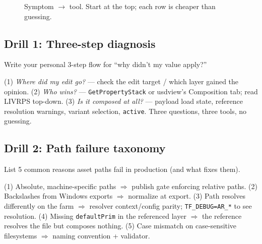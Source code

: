 \begin{figure}[ht]
  \centering
  \caption{Symptom $\rightarrow$ tool. Start at the top; each row is cheaper
  than guessing.}
  \label{fig:debug-tree}
\end{figure}

\DrillsTitle
\subsection*{Drill 1: Three-step diagnosis}
Write your personal 3-step flow for ``why didn't my value apply?''
\begin{DrillSolution}
(1) \emph{Where did my edit go?} --- check the edit target / which layer
gained the opinion. (2) \emph{Who wins?} --- \texttt{GetPropertyStack} or
usdview's Composition tab; read LIVRPS top-down. (3) \emph{Is it composed at
all?} --- payload load state, reference resolution warnings, variant
selection, \texttt{active}. Three questions, three tools, no guessing.
\end{DrillSolution}

\subsection*{Drill 2: Path failure taxonomy}
List 5 common reasons asset paths fail in production (and what fixes them).
\begin{DrillSolution}
(1) Absolute, machine-specific paths $\Rightarrow$ publish gate enforcing
relative paths. (2) Backslashes from Windows exports $\Rightarrow$ normalize
at export. (3) Path resolves differently on the farm $\Rightarrow$ resolver
context/config parity; \texttt{TF\_DEBUG=AR\_*} to see resolution. (4)
Missing \texttt{defaultPrim} in the referenced layer $\Rightarrow$ the
reference resolves the file but composes nothing. (5) Case mismatch on
case-sensitive filesystems $\Rightarrow$ naming convention + validator.
\end{DrillSolution}


